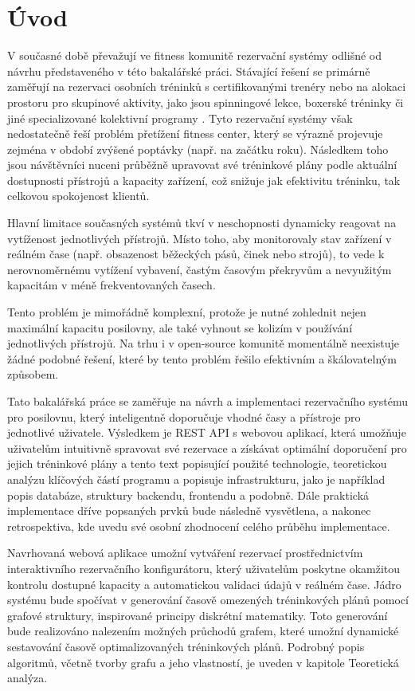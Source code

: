 \chapter{Úvod} \label{intro}
\label{sec:Introduction}
V současné době převažují ve fitness komunitě rezervační systémy odlišné od návrhu představeného v této bakalářské práci. Stávající řešení se primárně zaměřují na rezervaci osobních tréninků s certifikovanými trenéry nebo na alokaci prostoru pro skupinové aktivity, jako jsou spinningové lekce, boxerské tréninky či jiné specializované kolektivní programy \cite{gymmasterManagementSoftware, mindbodyonlineBestFitness}. Tyto rezervační systémy však nedostatečně řeší problém přetížení fitness center, který se výrazně projevuje zejména v období zvýšené poptávky (např. na začátku roku). Následkem toho jsou návštěvníci nuceni průběžně upravovat své tréninkové plány podle aktuální dostupnosti přístrojů a kapacity zařízení, což snižuje jak efektivitu tréninku, tak celkovou spokojenost klientů.

Hlavní limitace současných systémů tkví v neschopnosti dynamicky reagovat na vytíženost jednotlivých přístrojů. Místo toho, aby monitorovaly stav zařízení v reálném čase (např. obsazenost běžeckých pásů, činek nebo strojů), to vede k nerovnoměrnému vytížení vybavení, častým časovým překryvům a nevyužitým kapacitám v méně frekventovaných časech.

Tento problém je mimořádně komplexní, protože je nutné zohlednit nejen maximální kapacitu posilovny, ale také vyhnout se kolizím v používání jednotlivých přístrojů. Na trhu i v open-source komunitě momentálně neexistuje žádné podobné řešení, které by tento problém řešilo efektivním a škálovatelným způsobem\cite{bookywayPrenotazioneUniversale}.

Tato bakalářská práce se zaměřuje na návrh a implementaci rezervačního systému pro posilovnu, který inteligentně doporučuje vhodné časy a přístroje pro jednotlivé uživatele. Výsledkem je REST API s webovou aplikací, která umožňuje uživatelům intuitivně spravovat své rezervace a získávat optimální doporučení pro jejich tréninkové plány a tento text popisující použité technologie, teoretickou analýzu klíčových částí programu a popisuje infrastrukturu, jako je například popis databáze, struktury backendu, frontendu a podobně. Dále praktická implementace dříve popsaných prvků bude následně vysvětlena, a nakonec retrospektiva, kde uvedu své osobní zhodnocení celého průběhu implementace.

Navrhovaná webová aplikace umožní vytváření rezervací prostřednictvím interaktivního rezervačního konfigurátoru, který uživatelům poskytne okamžitou kontrolu dostupné kapacity a automatickou validaci údajů v reálném čase. Jádro systému bude spočívat v generování časově omezených tréninkových plánů pomocí grafové struktury, inspirované principy diskrétní matematiky. Toto generování bude realizováno nalezením možných průchodů grafem, které umožní dynamické sestavování časově optimalizovaných tréninkových plánů. Podrobný popis algoritmů, včetně tvorby grafu a jeho vlastností, je uveden v kapitole Teoretická analýza.
\endinput
